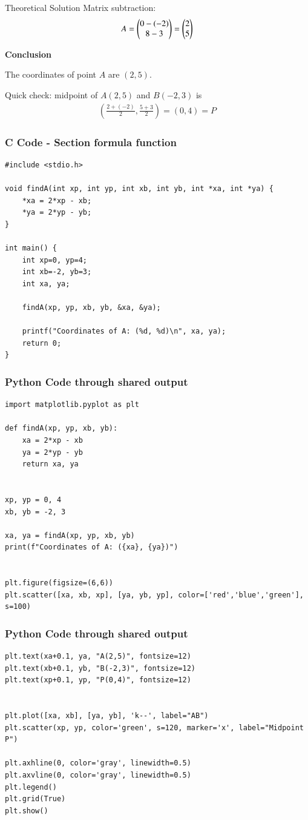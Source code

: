 \documentclass{beamer}
\begin{document}
\begin{frame}{Theoretical Solution}
    Matrix subtraction:  
\begin{align*}
A = \myvec{0 - (-2) \\ 8 - 3} 
= \myvec{2 \\ 5}    
\end{align*}



\textbf{Conclusion} 

The coordinates of point $A$ are $(2,5)$.  

Quick check: midpoint of $A(2,5)$ and $B(-2,3)$ is  
\begin{align*}
    \left(\frac{2+(-2)}{2}, \frac{5+3}{2}\right) = (0,4) = P
\end{align*}
\end{frame}

\begin{frame}[fragile]
\frametitle{C Code - Section formula function}
\begin{lstlisting}
#include <stdio.h>

void findA(int xp, int yp, int xb, int yb, int *xa, int *ya) {
    *xa = 2*xp - xb;
    *ya = 2*yp - yb;
}

int main() {
    int xp=0, yp=4;
    int xb=-2, yb=3;
    int xa, ya;
    
    findA(xp, yp, xb, yb, &xa, &ya);
    
    printf("Coordinates of A: (%d, %d)\n", xa, ya);
    return 0;
}
\end{lstlisting}
\end{frame}

\begin{frame}[fragile]
	\frametitle{Python Code through shared output}
	\begin{lstlisting}
import matplotlib.pyplot as plt

def findA(xp, yp, xb, yb):
    xa = 2*xp - xb
    ya = 2*yp - yb
    return xa, ya


xp, yp = 0, 4
xb, yb = -2, 3

xa, ya = findA(xp, yp, xb, yb)
print(f"Coordinates of A: ({xa}, {ya})")


plt.figure(figsize=(6,6))
plt.scatter([xa, xb, xp], [ya, yb, yp], color=['red','blue','green'], s=100)
\end{lstlisting}
\end{frame}

\begin{frame}[fragile]
	\frametitle{Python Code through shared output}
	\begin{lstlisting}
plt.text(xa+0.1, ya, "A(2,5)", fontsize=12)
plt.text(xb+0.1, yb, "B(-2,3)", fontsize=12)
plt.text(xp+0.1, yp, "P(0,4)", fontsize=12)


plt.plot([xa, xb], [ya, yb], 'k--', label="AB")
plt.scatter(xp, yp, color='green', s=120, marker='x', label="Midpoint P")

plt.axhline(0, color='gray', linewidth=0.5)
plt.axvline(0, color='gray', linewidth=0.5)
plt.legend()
plt.grid(True)
plt.show()
\end{lstlisting}
\end{frame}
\end{document}
